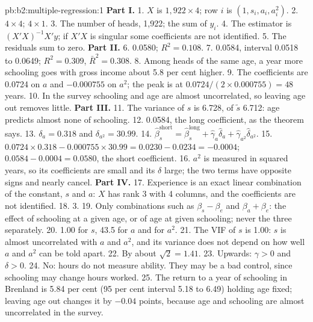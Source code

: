 \begin{solution}{pb:b2:multiple-regression:1}
\textbf{Part I.}
1. $X$ is $1{,}922 \times 4$; row $i$ is $(1, s_i, a_i, a_i^2)$.
2. $4 \times 4$; $4 \times 1$.
3. The number of heads, 1,922; the sum of $y_i$.
4. The estimator is $(X'X)^{-1}X'y$; if $X'X$ is singular some coefficients are not identified.
5. The residuals sum to zero.
\textbf{Part II.}
6. 0.0580; $R^2 = 0.108$.
7. 0.0584, interval 0.0518 to 0.0649; $R^2 = 0.309$, $\bar R^2 = 0.308$.
8. Among heads of the same age, a year more schooling goes with gross income about 5.8 per cent higher.
9. The coefficients are 0.0724 on $a$ and $-0.000755$ on $a^2$; the peak is at $0.0724/(2 \times 0.000755) = 48$ years.
10. In the survey schooling and age are almost uncorrelated, so leaving age out removes little.
\textbf{Part III.}
11. The variance of $s$ is 6.728, of $\tilde s$ 6.712: age predicts almost none of schooling.
12. 0.0584, the long coefficient, as the theorem says.
13. $\delta_a = 0.318$ and $\delta_{a^2} = 30.99$.
14. $\hat\beta_s^{\text{short}} = \hat\beta_s^{\text{long}} + \hat\gamma_a\hat\delta_a + \hat\gamma_{a^2}\hat\delta_{a^2}$.
15. $0.0724 \times 0.318 - 0.000755 \times 30.99 = 0.0230 - 0.0234 = -0.0004$; $0.0584 - 0.0004 = 0.0580$, the short
coefficient.
16. $a^2$ is measured in squared years, so its coefficients are small and its $\delta$ large; the two terms have opposite
signs and nearly cancel.
\textbf{Part IV.}
17. Experience is an exact linear combination of the constant, $s$ and $a$: $X$ has rank 3 with 4 columns, and the
coefficients are not identified.
18. 3.
19. Only combinations such as $\beta_s - \beta_e$ and $\beta_a + \beta_e$: the effect of schooling at a given age, or of age
at given schooling; never the three separately.
20. 1.00 for $s$, 43.5 for $a$ and for $a^2$.
21. The VIF of $s$ is 1.00: $s$ is almost uncorrelated with $a$ and $a^2$, and its variance does not depend on how well $a$
and $a^2$ can be told apart.
22. By about $\sqrt2 = 1.41$.
23. Upwards: $\gamma > 0$ and $\delta > 0$.
24. No: hours do not measure ability. They may be a bad control, since schooling may change hours worked.
25. The return to a year of schooling in Brenland is 5.84 per cent (95 per cent interval 5.18 to 6.49) holding age fixed;
leaving age out changes it by $-0.04$ points, because age and schooling are almost uncorrelated in the survey.
\end{solution}
